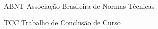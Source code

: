 
\begin{siglas}
    \item[ABNT] Associação Brasileira de Normas Técnicas
    \item[TCC] Trabalho de Conclusão de Curso
\end{siglas}
